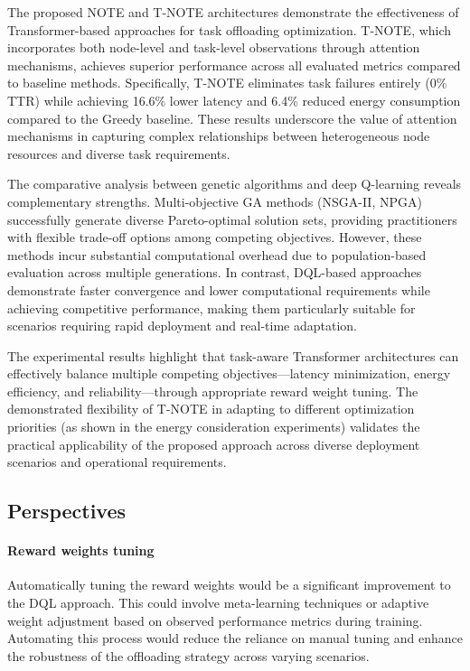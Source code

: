 \documentclass{svproc}
\begin{document}
The proposed NOTE and T-NOTE architectures demonstrate the effectiveness of Transformer-based approaches for task offloading optimization. T-NOTE, which incorporates both node-level and task-level observations through attention mechanisms, achieves superior performance across all evaluated metrics compared to baseline methods. Specifically, T-NOTE eliminates task failures entirely (0\% TTR) while achieving 16.6\% lower latency and 6.4\% reduced energy consumption compared to the Greedy baseline. These results underscore the value of attention mechanisms in capturing complex relationships between heterogeneous node resources and diverse task requirements.

The comparative analysis between genetic algorithms and deep Q-learning reveals complementary strengths. Multi-objective GA methods (NSGA-II, NPGA) successfully generate diverse Pareto-optimal solution sets, providing practitioners with flexible trade-off options among competing objectives. However, these methods incur substantial computational overhead due to population-based evaluation across multiple generations. In contrast, DQL-based approaches demonstrate faster convergence and lower computational requirements while achieving competitive performance, making them particularly suitable for scenarios requiring rapid deployment and real-time adaptation.

The experimental results highlight that task-aware Transformer architectures can effectively balance multiple competing objectives—latency minimization, energy efficiency, and reliability—through appropriate reward weight tuning. The demonstrated flexibility of T-NOTE in adapting to different optimization priorities (as shown in the energy consideration experiments) validates the practical applicability of the proposed approach across diverse deployment scenarios and operational requirements.

\subsection{Perspectives}


\paragraph{Reward weights tuning}

Automatically tuning the reward weights would be a significant improvement to the DQL approach. This could involve meta-learning techniques or adaptive weight adjustment based on observed performance metrics during training. Automating this process would reduce the reliance on manual tuning and enhance the robustness of the offloading strategy across varying scenarios.
\end{document}
